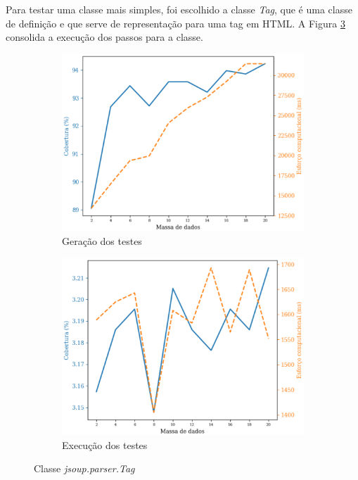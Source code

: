 Para testar uma classe mais simples, foi escolhido a classe \textit{Tag}, que é uma classe de definição e que serve de representação para uma tag em HTML. A Figura \ref{fig:JsoupTag} consolida a execução dos passos para a classe.

\begin{figure}[H]
    \centering
    \begin{subfigure}{.5\textwidth}
        \centering
        \includegraphics[scale=0.5]{figuras/jsoup.parser.tag_generation.eps}
        \caption{Geração dos testes}
        \label{fig:genJsoupTag}
    \end{subfigure}%
    \begin{subfigure}{.5\textwidth}
        \centering
        \includegraphics[scale=0.5]{figuras/jsoup.parser.tag_execution.eps}
        \caption{Execução dos testes}
        \label{fig:execJsoupTag}
    \end{subfigure}
    \caption{Classe \textit{jsoup.parser.Tag}}
\label{fig:JsoupTag}
\end{figure}


